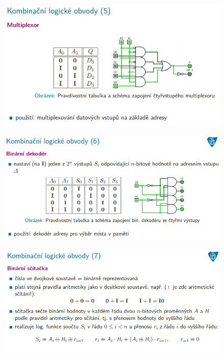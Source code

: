 \documentclass[10pt,a4paper]{article}
\begin{document}
\begin{figure} [h]
	\includegraphics[scale=0.65]{img/prvni_odstavec/otazka2/kombinacni_logicke_obvody5.png}	
\end{figure}

\begin{figure} [h]
	\includegraphics[scale=0.65]{img/prvni_odstavec/otazka2/kombinacni_logicke_obvody6.png}	
\end{figure}

\begin{figure} [h]
	\includegraphics[scale=0.65]{img/prvni_odstavec/otazka2/kombinacni_logicke_obvody7.png}	
\end{figure}
\end{document}
